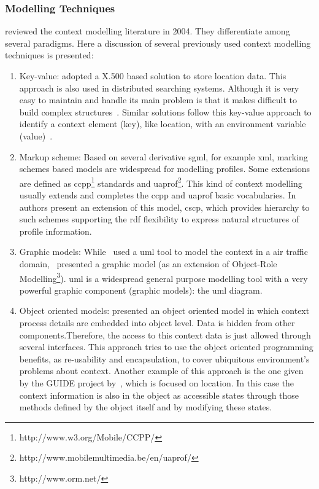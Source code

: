 
\subsubsection{Modelling Techniques}
\label{sec:modelling_techniques}

\citet{strang_context_2004} reviewed the context modelling literature in 2004.
They differentiate among several paradigms. Here a discussion of several 
previously used context modelling techniques is presented:

\begin{enumerate}
  \item Key-value: \citet{maass_location_aware_1998} adopted a X.500 based 
  solution to store location data. This approach is also used in distributed 
  searching systems. Although it is very easy to maintain and handle its main 
  problem is that it makes difficult to build complex structures~\citep{strang_context_2004}. 
  Similar solutions follow this key-value approach to identify a context element 
  (key), like location, with an environment variable (value)~\citep{schilit_customizing_1993}\citep{voelker_mobisaic_1996}. 
  
  \item Markup scheme: Based on several derivative \ac{sgml}, for example 
  \ac{xml}, marking schemes based models are widespread for modelling profiles. 
  Some extensions are defined as \ac{ccpp}\footnote{http://www.w3.org/Mobile/CCPP/} 
  standards and \ac{uaprof}\footnote{http://www.mobilemultimedia.be/en/uaprof/}. 
  This kind of context modelling usually extends and completes the \ac{ccpp} and 
  \ac{uaprof} basic vocabularies. In~\citep{held_modeling_2002} authors present 
  an extension of this model, \ac{cscp}, which provides hierarchy to such schemes 
  supporting the \ac{rdf} flexibility to express natural structures of profile 
  information.
  
  \item Graphic models: While~\citet{bauer_identification_2003} used a \ac{uml} 
  tool to model the context in a air traffic domain,~\citet{henricksen_generating_2003} 
  presented a graphic model (as an extension of Object-Role Modelling\footnote{http://www.orm.net/}). 
  \ac{uml} is a widespread general purpose modelling tool with a very powerful 
  graphic component (graphic models): the \ac{uml} diagram. 
  
  \item Object oriented models: \citet{strang_context_2004} presented an object 
  oriented model in which context process details are embedded into object level. 
  Data is hidden from other components.Therefore, the access to this context data 
  is just allowed through several interfaces. This approach tries to use the 
  object oriented programming benefits, as re-usability and encapsulation, to 
  cover ubiquitous environment's problems about context. Another example of this 
  approach is the one given by the GUIDE project by~\citet{cheverst_design_1999}, 
  which is focused on location. In this case the context information is also in 
  the object as accessible states through those methods defined by the object 
  itself and by modifying these states.
  

\end{enumerate}
